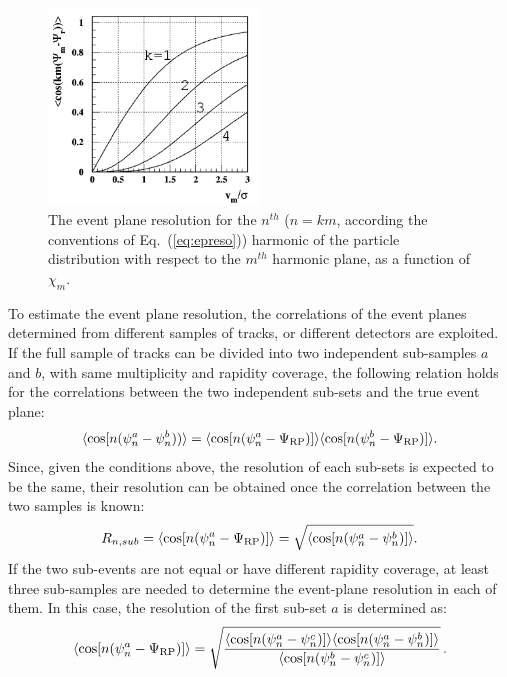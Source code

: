 \begin{figure}
\centering
 \includegraphics[width=0.5\textwidth]{FigCap5/resolBessel.png}
 \caption[Event plane resolution vs $\chi_m$]{The event plane resolution for the $n^{ th}$ ($n=km$, according the conventions of Eq.~(\ref{eq:epreso})) harmonic of the particle distribution with respect to the $m^{ th}$ harmonic plane, as a function of $\chi_m$.}
 \label{fig:resoBessel}
\end{figure}
To estimate the event plane resolution, the correlations of the event planes determined
from different samples of tracks, or different detectors are exploited.
If the full sample of tracks can be divided into two independent sub-samples 
$a$ and $b$, with same multiplicity and rapidity coverage,
the following relation holds for the correlations between the
two independent sub-sets and the true event plane:
\begin{equation}
\langle {\rm cos} [n({\rm \psi}^a_n-{\rm \psi}^b_n)) \rangle = 
\langle {\rm cos} [n({\rm \psi}^a_n-{\rm \Psi}_{\rm RP})] \rangle \langle {\rm cos} [n({\rm \psi}^b_n-{\rm \Psi}_{\rm RP})] \rangle .
\end{equation}
Since, given the conditions above, the resolution of each sub-sets is expected 
to be the same, their resolution can be obtained 
once the correlation between the two samples is known:
\begin{equation}
R_{n, sub} = \langle {\rm cos} [n({\rm \psi}^a_n-{\rm \Psi}_{\rm RP})] \rangle = \sqrt{\langle {\rm cos} [n({\rm \psi}^a_n-{\rm \psi}^b_n)] \rangle}.
\end{equation}
If the two sub-events are not equal or have different rapidity coverage,
at least three sub-samples are needed to determine the 
event-plane resolution in each of them. In this case, 
the resolution of the first sub-set $a$ is determined as:
\begin{equation}
 \langle {\rm cos} [n({\rm \psi}^a_n-{\rm \Psi}_{\rm RP})] \rangle = 
\sqrt{\frac{\langle\cos [n(\psi_n^a-\psi_n^c)] \rangle \langle\cos [n(\psi_n^a-\psi_n^b)] \rangle}{\langle\cos [n(\psi_n^b-\psi_n^c)] \rangle}}\, .
\end{equation}

